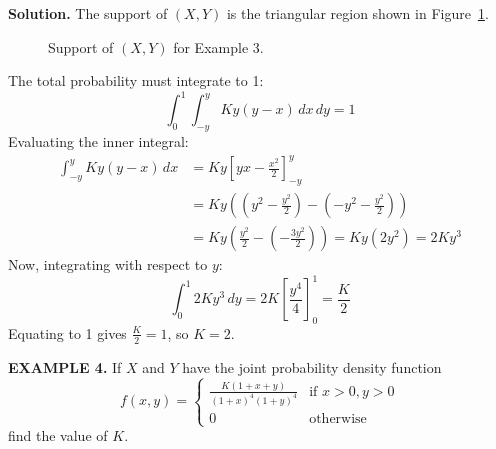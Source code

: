 \documentclass{article}
\begin{document}
\textbf{Solution.} The support of $(X,Y)$ is the triangular region shown in Figure~\ref{fig:ex3}.
\begin{figure}[H]
\centering
{}
\caption{Support of $(X,Y)$ for Example 3.}
\label{fig:ex3}
\end{figure}
The total probability must integrate to 1:
$$\int_{0}^{1} \int_{-y}^{y} Ky(y-x) \,dx \,dy = 1$$
Evaluating the inner integral:
\begin{align*}
\int_{-y}^{y} Ky(y-x) \,dx &= Ky \left[ yx - \frac{x^2}{2} \right]_{-y}^{y} \\
&= Ky \left( \left(y^2 - \frac{y^2}{2}\right) - \left(-y^2 - \frac{y^2}{2}\right) \right) \\
&= Ky \left( \frac{y^2}{2} - \left(-\frac{3y^2}{2}\right) \right) = Ky (2y^2) = 2Ky^3
\end{align*}
Now, integrating with respect to $y$:
$$\int_{0}^{1} 2Ky^3 \,dy = 2K \left[ \frac{y^4}{4} \right]_{0}^{1} = \frac{K}{2}$$
Equating to 1 gives $\frac{K}{2} = 1$, so $K = 2$.

\vspace{1em}

\textbf{EXAMPLE 4.} If $X$ and $Y$ have the joint probability density function
$$
f(x,y) = \begin{cases} \frac{K(1+x+y)}{(1+x)^4 (1+y)^4} & \text{if } x > 0, y > 0 \\ 0 & \text{otherwise} \end{cases}
$$
find the value of $K$.
\end{document}
